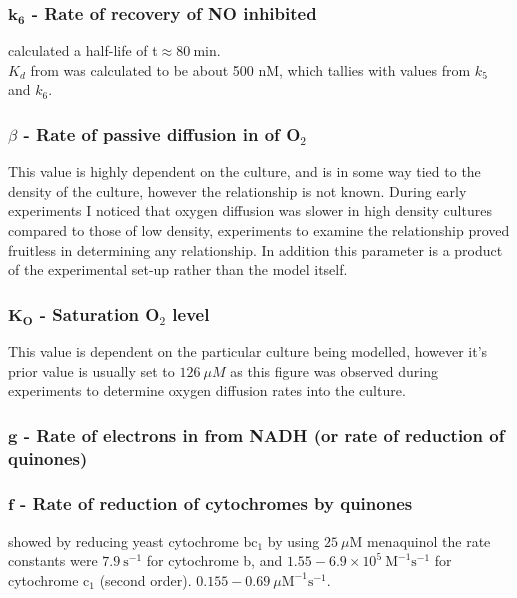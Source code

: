 \subsubsection*{$\mathbf{k_6}$ {\bf- Rate of recovery of NO inhibited \cbbthree{}}}
\citet{Giuffre2000} calculated a half-life of t\textonehalf $\approx 80~\mathrm{min}$.\\
$K_d$ from \citet{Rock2007} was calculated to be about 500 nM, which tallies with values from $k_5$ and $k_6$.

\subsubsection*{$\beta$ {\bf- Rate of passive diffusion in of O$_{\textrm{2}}$}}
This value is highly dependent on the culture, and is in some way tied to the density of the culture, however the relationship is not known. During early experiments I noticed that oxygen diffusion was slower in high density cultures compared to those of low density, experiments to examine the relationship proved fruitless in determining any relationship. In addition this parameter is a product of the experimental set-up rather than the model itself.

\subsubsection*{$\mathbf{K_O}$ {\bf- Saturation O$_{\textrm{2}}$ level}}
This value is dependent on the particular culture being modelled, however it's prior value is usually set to $126~\mu M$ as this figure was observed during experiments to determine oxygen diffusion rates into the culture.

\subsubsection*{$\mathbf{g}$ {\bf- Rate of electrons in from NADH (or rate of reduction of quinones)}}


\subsubsection*{$\mathbf{f}$ {\bf- Rate of reduction of cytochromes by quinones}}
\citet{Snyder2000} showed by reducing yeast cytochrome $\mathrm{bc}_1$ by using $25~\mu\mathrm{M}$ menaquinol the rate constants were $7.9~\mathrm{s}^{-1}$ for cytochrome b, and $1.55-6.9\times10^5~\mathrm{M}^{-1}\mathrm{s}^{-1}$ for cytochrome $\mathrm{c}_1$ (second order). $0.155 - 0.69~\mu\mathrm{M}^{-1}\mathrm{s}^{-1}$.

